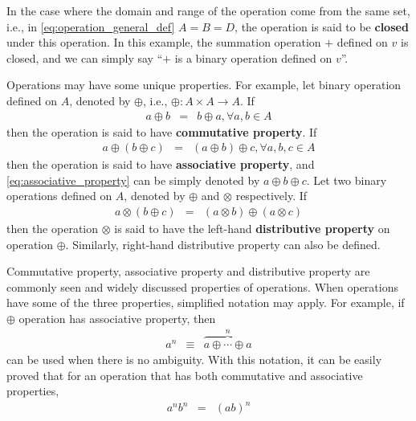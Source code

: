 In the case where the domain and range of the operation come from the same set, i.e., in \eqref{eq:operation_general_def} $A=B=D$, the operation is said to be \textbf{closed} under this operation. In this example, the summation operation $+$ defined on $v$ is closed, and we can simply say ``$+$ is a binary operation defined on $v$''.

Operations may have some unique properties. For example, let binary operation defined on $A$, denoted by $\oplus $, i.e., $\oplus: A\times A \rightarrow A$. If
\begin{eqnarray}
	a \oplus b &=& b \oplus a, \forall a, b \in A \nonumber
\end{eqnarray}
then the operation is said to have \textbf{commutative property}. If
\begin{eqnarray}
	a \oplus (b \oplus c) &=& (a \oplus b) \oplus c, \forall a,b,c \in A \label{eq:associative_property}
\end{eqnarray}
then the operation is said to have \textbf{associative property}, and \eqref{eq:associative_property} can be simply denoted by $a \oplus b \oplus c$. Let two binary operations defined on $A$, denoted by $\oplus$ and $\otimes$ respectively. If
\begin{eqnarray}
	a \otimes (b \oplus c) &=& (a \otimes b) \oplus (a \otimes c) \nonumber
\end{eqnarray}
then the operation $\otimes$ is said to have the left-hand \textbf{distributive property} on operation $\oplus$. Similarly, right-hand distributive property can also be defined.  

Commutative property, associative property and distributive property are commonly seen and widely discussed properties of operations. When operations have some of the three properties, simplified notation may apply. For example, if $\oplus$ operation has associative property, then
\begin{eqnarray}
	a^n &\equiv& \overbrace{a \oplus \cdots \oplus a}^{n} \nonumber
\end{eqnarray}
can be used when there is no ambiguity. With this notation, it can be easily proved that for an operation that has both commutative and associative properties,
\begin{eqnarray}
	a^nb^n & = & (ab)^n \nonumber 
\end{eqnarray}

